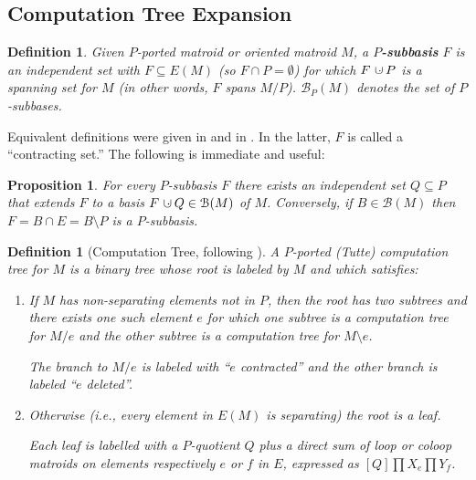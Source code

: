 \documentclass[12pt,leqno]{amsart}
\newtheorem{prop}[lem]{Proposition}
\newtheorem{definition}[lem]{Definition}
\theoremstyle{remark}
\newcommand{\dunion}
{\mbox{\hbox{\hskip6pt$\cdot$\hskip-5.50pt$\cup$\hskip2pt}}}
\begin{document}
\subsection{Computation Tree Expansion}
\begin{definition}
Given $P$-ported matroid or oriented matroid $M$,
a \textbf{$P$-subbasis} $F$
is an independent set  with $F\subseteq E(M)$
(so $F\cap P=\emptyset$) for which $F\dunion P$ is a spanning set
for $M$
(in other words, $F$ spans $M/P$).
$\mathcal{B}_P(M)$ denotes the set of $P$-subbases.
\end{definition}

Equivalent definitions were given in \cite{SetPointedLV}
and in \cite{RelTuttePoly}.   In the latter, $F$ is called a
``contracting set.'' The following is immediate and
useful:

\begin{prop}
For every $P$-subbasis $F$ there exists an independent set $Q\subseteq P$
that extends $F$ to a basis $F\dunion Q\in \mathcal{B}(M)$ of $M$.
Conversely, if $B\in\mathcal{B}(M)$ then $F=B\cap E=B\setminus P$
is a $P$-subbasis.
\end{prop}

\begin{definition}[Computation Tree, following \cite{GordonMcMachonGreedoid}]
\label{CompTreeDef}
A $P$-ported (Tutte) computation tree for $M$ is a
binary tree whose root is labeled by $M$ and which satisfies:
\begin{enumerate}
\item If $M$ has non-separating elements not in $P$, then 
the root has two subtrees and there exists one such element $e$ for which 
one subtree is a computation tree
for $M/e$ and the other subtree is a computation tree for 
$M\setminus e$.

The branch to $M/e$ is labeled with ``$e$ contracted'' and 
the other branch is labeled ``$e$ deleted''.
\item Otherwise (i.e., every element in $E(M)$
is separating) the root is a leaf.  

Each leaf is labelled with a $P$-quotient $Q$ plus a direct sum
of loop or coloop matroids on elements respectively $e$ or $f$ in $E$, 
expressed
as $[Q]\prod X_e \prod Y_f$.
\end{enumerate}
\end{definition}

\end{document}

